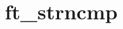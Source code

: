 \chapter{ft\+\_\+strncmp}
\hypertarget{md_Documentation_2ft__strncmp}{}\label{md_Documentation_2ft__strncmp}
